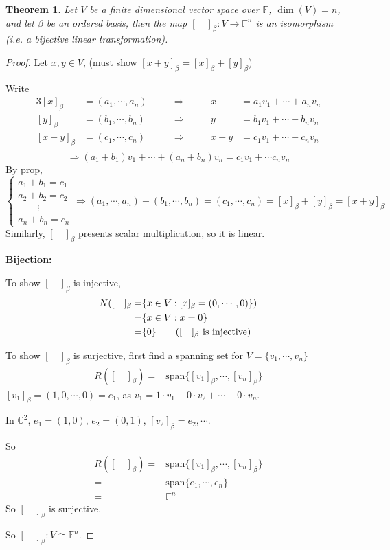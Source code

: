 \documentclass[12pt]{article}
\newtheorem{theorem}{Theorem}[subsection]
\newcommand{\Span}{\mathrm{span}}
\newcommand{\mC}{{\mathbb{C}}}
\newcommand{\mF}{{\mathbb{F}}}
\begin{document}
	\begin{theorem}
		Let $V$ be a finite dimensional vector space over $\mF$, $\dim(V) = n$,
		and let $\beta$ be an ordered basis, then the map 
		$[ \quad ]_{\beta} : V\to \mF^n$ is an isomorphism (i.e. a bijective 
		linear transformation).  
	\end{theorem}
	\begin{proof}
		Let $x, y \in V$, (must show $[x+y]_{\beta} = [x]_{\beta}+[y]_{\beta}$)

		Write 
		\begin{alignat*}{3}
			[x]_{\beta} &= (a_1, \cdots, a_n) 
						&\qquad \Rightarrow \qquad &
			x &= a_1v_1 + \cdots+a_nv_n\\
			[y]_{\beta} &= (b_1, \cdots, b_n)
						&\qquad \Rightarrow \qquad& 
			y &= b_1v_1 + \cdots+b_nv_n\\
			[x+y]_{\beta} &= (c_1, \cdots, c_n)
						  &\qquad \Rightarrow \qquad &
			x+y &= c_1v_1 + \cdots+c_nv_n\\
		\end{alignat*}
		\[
			\Rightarrow (a_1+b_1)v_1+\cdots+(a_n+b_n)v_n = c_1v_1+\cdots c_nv_n
		\]
		By prop, 
		\[
			\begin{cases}
				a_1+b_1=c_1\\
				a_2+b_2=c_2\\
				\qquad \vdots\\
				a_n+b_n=c_n
			\end{cases}
			\Rightarrow (a_1,\cdots,a_n) + (b_1,\cdots, b_n) = (c_1,\cdots,c_n)
			= [x]_{\beta}+[y]_{\beta}=[x+y]_{\beta} 
		\]
		Similarly, $[\quad ]_{\beta}$ presents scalar multiplication, so it is
		linear. 

		\textbf{Bijection: }

		To show $[\quad]_{\beta}$ is injective, 
		\begin{align*}
			N([\quad]_{\beta} 
			=& \{x \in V: [x]_{\beta} = (0,\cdots,0)\})\\
			=& \{x \in V: x = 0\}\\
			=& \{0\}    \tag{$[\quad]_{\beta}$ is injective}
		\end{align*}

		To show $[\quad]_{\beta}$ is surjective,
		first find a spanning set for 
		$V = \{v_1,\cdots, v_n\}$
		\begin{align*}
			R([\quad]_{\beta}) 
			=& \Span\{[v_1]_{\beta}, \cdots, [v_n]_{\beta}\}
		\end{align*}
		$[v_1]_{\beta} = (1,0,\cdots, 0) = e_1$, 
		as $v_1 = 1\cdot v_1 + 0 \cdot v_2 + \cdots + 0 \cdot v_n$. 

		In $\mC^2$, $e_1 = (1, 0)$, $e_2 = (0,1)$, $[v_2]_{\beta} = e_2,\cdots$.

		So 
		\begin{align*}
			R([\quad]_{\beta}) 
			=& \Span\{[v_1]_{\beta}, \cdots, [v_n]_{\beta}\}\\
			=& \Span \{e_1,\cdots, e_n\}\\
			=& \mF^n 
		\end{align*}
		So $[\quad]_{\beta}$ is surjective. 

		So $[\quad]_{\beta} : V\cong \mF^n$. 

		\end{proof}
\end{document}
